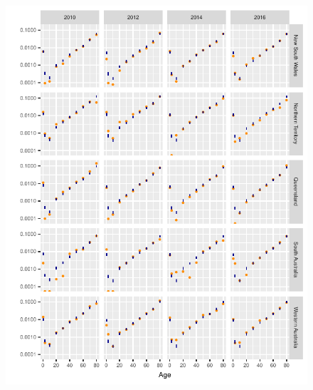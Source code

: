 \documentclass{article}
\begin{document}
\begin{figure}
  \centering
  \includegraphics{out/fig_rates_modelled_Male_Indigenous_Baseline}
\end{figure}
\newpage
\end{document}
